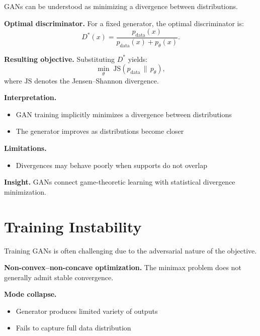 GANs can be understood as minimizing a divergence between distributions.

\medskip

\noindent
\textbf{Optimal discriminator.}  
For a fixed generator, the optimal discriminator is:
\[
D^*(x) = \frac{p_{\text{data}}(x)}{p_{\text{data}}(x) + p_\theta(x)}.
\]

\medskip

\noindent
\textbf{Resulting objective.}  
Substituting $D^*$ yields:
\[
\min_\theta \; \mathrm{JS}(p_{\text{data}} \,\|\, p_\theta),
\]
where $\mathrm{JS}$ denotes the Jensen--Shannon divergence.

\medskip

\noindent
\textbf{Interpretation.}
\begin{itemize}
    \item GAN training implicitly minimizes a divergence between distributions
    \item The generator improves as distributions become closer
\end{itemize}

\medskip

\noindent
\textbf{Limitations.}
\begin{itemize}
    \item Divergences may behave poorly when supports do not overlap
\end{itemize}

\medskip

\noindent
\textbf{Insight.}  
GANs connect game-theoretic learning with statistical divergence minimization.

\section{Training Instability}

Training GANs is often challenging due to the adversarial nature of the objective.

\medskip

\noindent
\textbf{Non-convex--non-concave optimization.}  
The minimax problem does not generally admit stable convergence.

\medskip

\noindent
\textbf{Mode collapse.}
\begin{itemize}
    \item Generator produces limited variety of outputs
    \item Fails to capture full data distribution
\end{itemize}

